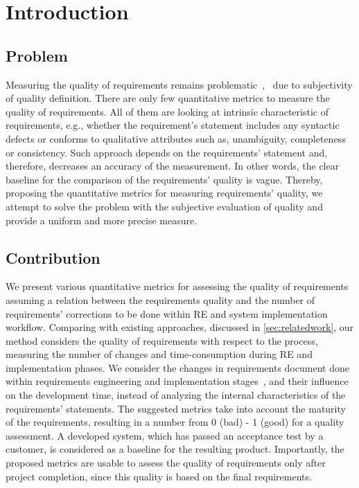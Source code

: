 \section{Introduction}
\label{sec:Intro} 

\subsection{Problem}
Measuring the quality of requirements remains problematic~\cite{Fernandez2016},~\cite{Mund:2017} 
due to subjectivity of quality definition. There are only few quantitative metrics to measure the quality of requirements. 
All of them are looking at intrinsic characteristic of requirements, e.g., whether the requirement’s statement 
includes any syntactic defects or conforms to qualitative attributes such as, unambiguity, completeness or consistency. 
Such approach depends on the requirements' statement and, therefore, decreases an accuracy of the measurement. 
In other words, the clear baseline for the comparison of the requirements' quality is vague. 
Thereby, proposing the quantitative metrics for measuring requirements' quality, we attempt 
to solve the problem with the subjective evaluation of quality and provide a uniform and more precise measure. 


\subsection{Contribution}
We present various quantitative metrics for assessing the quality of requirements assuming a relation 
between the requirements quality and the number of requirements' corrections to be done within RE and system implementation workflow. 
Comparing with existing approaches, discussed in \autoref{sec:relatedwork}, our method considers the quality of 
requirements with respect to the process, measuring the number of changes and time-consumption during RE and 
implementation phases. We consider the changes in requirements document done within 
requirements engineering and implementation stages~\cite{FARBEY:1990}, and their influence on the development time, 
instead of analyzing the internal characteristics of the requirements' statements. 
The suggested metrics take into account the maturity of the requirements, 
resulting in a number from 0 (bad) - 1 (good) for a quality assessment.  
A developed system, which has passed an acceptance test by a customer, is considered as a baseline 
for the resulting product. Importantly, the proposed metrics are usable to assess the quality of requirements 
only after project completion, since this quality is based on the final requirements.

